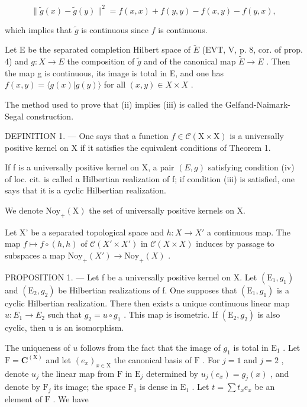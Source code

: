 \[
\| \widetilde {g} (x) - \widetilde {g} (y) \| ^ {2} = f (x, x) + f (y, y) - f (x, y) - f (y, x),
\]

which implies that \(\widetilde{g}\) is continuous since \(f\) is continuous.

Let E be the separated completion Hilbert space of \(\widetilde{E}\) (EVT, V, p. 8, cor. of prop. 4) and \(g\colon X \to E\) the composition of \(\widetilde{g}\) and of the canonical map \(\widetilde{E} \to E\) . Then the map g is continuous, its image is total in E, and one has \(f(x,y) = \langle g(x) | g(y) \rangle\) for all \((x,y) \in X \times X\) .

The method used to prove that (ii) implies (iii) is called the Gelfand-Naimark-Segal construction.

DEFINITION 1. --- One says that a function \(f \in \mathcal{C}(\mathrm{X} \times \mathrm{X})\) is a universally positive kernel on X if it satisfies the equivalent conditions of Theorem 1.

If f is a universally positive kernel on X, a pair \((E,g)\) satisfying condition (iv) of loc. cit. is called a Hilbertian realization of f; if condition (iii) is satisfied, one says that it is a cyclic Hilbertian realization.

We denote \(\mathrm{Noy}_{+}(\mathrm{X})\) the set of universally positive kernels on X.

Let X' be a separated topological space and \(h: X \to X'\) a continuous map. The map \(f \mapsto f \circ (h, h)\) of \(\mathcal{C}(X' \times X')\) in \(\mathcal{C}(X \times X)\) induces by passage to subspaces a map \(\mathrm{Noy}_{+}(X') \to \mathrm{Noy}_{+}(X)\) .

PROPOSITION 1. --- Let f be a universally positive kernel on X. Let \((\mathrm{E}_{1}, g_{1})\) and \((\mathrm{E}_{2}, g_{2})\) be Hilbertian realizations of f. One supposes that \((\mathrm{E}_{1}, g_{1})\) is a cyclic Hilbertian realization. There then exists a unique continuous linear map \(u: E_{1} \to E_{2}\) such that \(g_{2} = u \circ g_{1}\) . This map is isometric. If \((\mathrm{E}_{2}, g_{2})\) is also cyclic, then u is an isomorphism.

The uniqueness of \(u\) follows from the fact that the image of \(g_{1}\) is total in \(\mathrm{E}_{1}\) . Let \(\mathrm{F} = \mathbf{C}^{(\mathrm{X})}\) and let \((e_x)_{x\in \mathrm{X}}\) the canonical basis of \(\mathrm{F}\) . For \(j = 1\) and \(j = 2\) , denote \(u_{j}\) the linear map from \(\mathrm{F}\) in \(\mathrm{E}_{j}\) determined by \(u_{j}(e_{x}) = g_{j}(x)\) , and denote by \(\mathrm{F}_{j}\) its image; the space \(\mathrm{F}_{1}\) is dense in \(\mathrm{E}_{1}\) . Let \(t = \sum t_{x}e_{x}\) be an element of \(\mathrm{F}\) . We have

